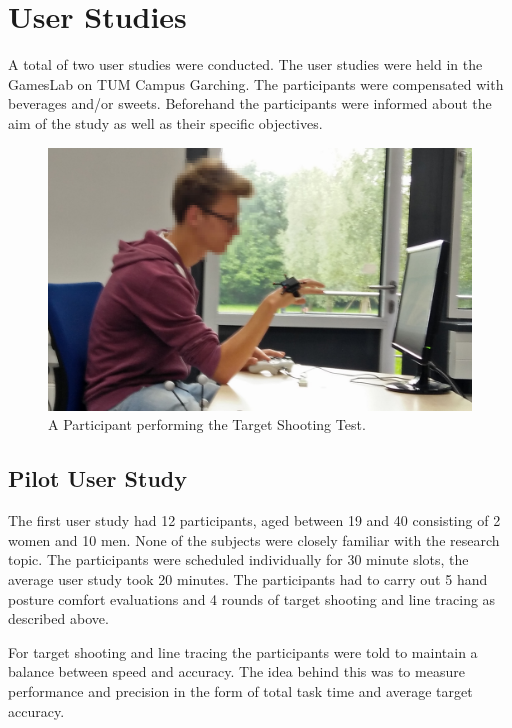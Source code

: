 \chapter{User Studies}\label{chapter:userstudy}

A total of two user studies were conducted. The user studies were held in the GamesLab on TUM Campus Garching. The participants were compensated with beverages and/or sweets. Beforehand the participants were informed about the aim of the study as well as their specific objectives. 

\begin{figure}[h]
\centering
\includegraphics[width=\textwidth]{baschde}
\caption{A Participant performing the Target Shooting Test.}
\label{fig:baschde}
\end{figure}

\section{Pilot User Study}

The first user study had 12 participants, aged between 19 and 40 consisting of 2 women and 10 men. None of the subjects were closely familiar with the research topic. The participants were scheduled individually for 30 minute slots, the average user study took 20 minutes.
The participants had to carry out 5 hand posture comfort evaluations and 4 rounds of target shooting and line tracing as described above. 

For target shooting and line tracing the participants were told to maintain a balance between speed and accuracy. The idea behind this was to measure performance and precision in the form of total task time and average target accuracy. 

